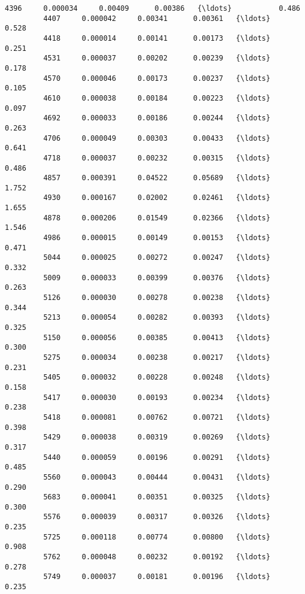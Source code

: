 \documentclass[11pt]{article}
\begin{document}
\begin{Verbatim}[commandchars=\\\{\}]
         4396     0.000034     0.00409      0.00386   {\ldots}           0.486   
         4407     0.000042     0.00341      0.00361   {\ldots}           0.528   
         4418     0.000014     0.00141      0.00173   {\ldots}           0.251   
         4531     0.000037     0.00202      0.00239   {\ldots}           0.178   
         4570     0.000046     0.00173      0.00237   {\ldots}           0.105   
         4610     0.000038     0.00184      0.00223   {\ldots}           0.097   
         4692     0.000033     0.00186      0.00244   {\ldots}           0.263   
         4706     0.000049     0.00303      0.00433   {\ldots}           0.641   
         4718     0.000037     0.00232      0.00315   {\ldots}           0.486   
         4857     0.000391     0.04522      0.05689   {\ldots}           1.752   
         4930     0.000167     0.02002      0.02461   {\ldots}           1.655   
         4878     0.000206     0.01549      0.02366   {\ldots}           1.546   
         4986     0.000015     0.00149      0.00153   {\ldots}           0.471   
         5044     0.000025     0.00272      0.00247   {\ldots}           0.332   
         5009     0.000033     0.00399      0.00376   {\ldots}           0.263   
         5126     0.000030     0.00278      0.00238   {\ldots}           0.344   
         5213     0.000054     0.00282      0.00393   {\ldots}           0.325   
         5150     0.000056     0.00385      0.00413   {\ldots}           0.300   
         5275     0.000034     0.00238      0.00217   {\ldots}           0.231   
         5405     0.000032     0.00228      0.00248   {\ldots}           0.158   
         5417     0.000030     0.00193      0.00234   {\ldots}           0.238   
         5418     0.000081     0.00762      0.00721   {\ldots}           0.398   
         5429     0.000038     0.00319      0.00269   {\ldots}           0.317   
         5440     0.000059     0.00196      0.00291   {\ldots}           0.485   
         5560     0.000043     0.00444      0.00431   {\ldots}           0.290   
         5683     0.000041     0.00351      0.00325   {\ldots}           0.300   
         5576     0.000039     0.00317      0.00326   {\ldots}           0.235   
         5725     0.000118     0.00774      0.00800   {\ldots}           0.908   
         5762     0.000048     0.00232      0.00192   {\ldots}           0.278   
         5749     0.000037     0.00181      0.00196   {\ldots}           0.235   
         

\end{Verbatim}
\end{document}
